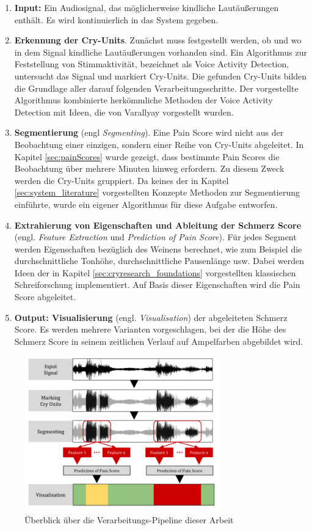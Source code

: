 \begin{enumerate}[leftmargin=*]
	\item \textbf{Input: } Ein Audiosignal, das möglicherweise kindliche Lautäußerungen enthält. Es wird kontinuierlich in das System gegeben.
	
	\item \textbf{Erkennung der Cry-Units}. Zunächst muss festgestellt werden, ob und wo in dem Signal kindliche Lautäußerungen vorhanden sind. Ein Algorithmus zur Feststellung von Stimmaktivität, bezeichnet als Voice Activity Detection, untersucht das Signal und markiert Cry-Units. Die gefunden Cry-Units bilden die Grundlage aller darauf folgenden Verarbeitungsschritte. Der vorgestellte Algorithmus kombinierte herkömmliche Methoden der Voice Activity Detection mit Ideen, die von Varallyay \cite{cry_thesis} vorgestellt wurden.
	
	\item \textbf{Segmentierung} (engl \emph{Segmenting}). Eine Pain Score wird nicht aus der Beobachtung einer einzigen, sondern einer Reihe von Cry-Units abgeleitet. In Kapitel \ref{sec:painScores} wurde gezeigt, dass bestimmte Pain Scores die Beobachtung über mehrere Minuten hinweg erfordern. Zu diesem Zweck werden die Cry-Units gruppiert. Da keines der in Kapitel \ref{sec:system_literature} vorgestellten Konzepte Methoden zur Segmentierung einführte, wurde ein eigener Algorithmus für diese Aufgabe entworfen.
	
	\item \textbf{Extrahierung von Eigenschaften und Ableitung der Schmerz Score} (engl. \emph{Feature Extraction} und \emph{Prediction of Pain Score}). Für jedes Segment werden Eigenschaften bezüglich des Weinens berechnet, wie zum Beispiel die durchschnittliche Tonhöhe, durchschnittliche Pausenlänge usw. Dabei werden Ideen der in Kapitel \ref{sec:cryresearch_foundations} vorgestellten klassischen Schreiforschung implementiert. Auf Basis dieser Eigenschaften wird die Pain Score abgeleitet.
	
	\item \textbf{Output: Visualisierung} (engl. \emph{Visualisation}) der abgeleiteten Schmerz Score. Es werden mehrere Varianten vorgeschlagen, bei der die Höhe des Schmerz Score in seinem zeitlichen Verlauf auf Ampelfarben abgebildet wird.
\end{enumerate}

\begin{figure}[H]
	\centering
	\includegraphics[width=0.75\textwidth]{bilder/konzept02.png}
	\caption{Überblick über die Verarbeitungs-Pipeline dieser Arbeit}
	\label{img:architecture-overview}
\end{figure}